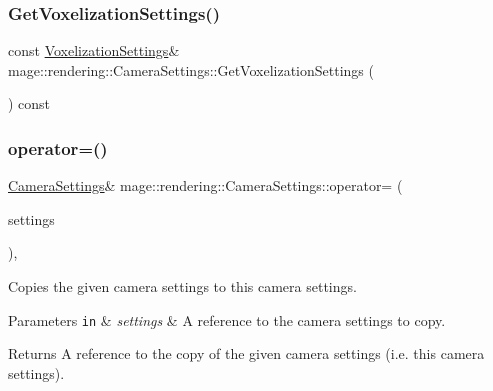 \subsubsection{\texorpdfstring{Get\+Voxelization\+Settings()}{GetVoxelizationSettings()}\hspace{0.1cm}{\footnotesize\ttfamily [2/2]}}
{\footnotesize\ttfamily const \mbox{\hyperlink{classmage_1_1rendering_1_1_voxelization_settings}{Voxelization\+Settings}}\& mage\+::rendering\+::\+Camera\+Settings\+::\+Get\+Voxelization\+Settings (\begin{DoxyParamCaption}{ }\end{DoxyParamCaption}) const\hspace{0.3cm}{\ttfamily [noexcept]}}

\mbox{\label{classmage_1_1rendering_1_1_camera_settings_a8cc59c883ea4c45a6bb7e9dc728856fd}} 
\subsubsection{\texorpdfstring{operator=()}{operator=()}\hspace{0.1cm}{\footnotesize\ttfamily [1/2]}}
{\footnotesize\ttfamily \mbox{\hyperlink{classmage_1_1rendering_1_1_camera_settings}{Camera\+Settings}}\& mage\+::rendering\+::\+Camera\+Settings\+::operator= (\begin{DoxyParamCaption}\item[{const \mbox{\hyperlink{classmage_1_1rendering_1_1_camera_settings}{Camera\+Settings}} \&}]{settings }\end{DoxyParamCaption})\hspace{0.3cm}{\ttfamily [default]}, {\ttfamily [noexcept]}}

Copies the given camera settings to this camera settings.


\begin{DoxyParams}[1]{Parameters}
\mbox{\tt in}  & {\em settings} & A reference to the camera settings to copy. \\
\hline
\end{DoxyParams}
\begin{DoxyReturn}{Returns}
A reference to the copy of the given camera settings (i.\+e. this camera settings). 
\end{DoxyReturn}
\mbox{\label{classmage_1_1rendering_1_1_camera_settings_a28ae670d467adfc74ef8929f24b2e615}} 
